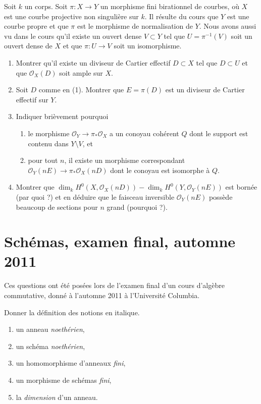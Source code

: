 \begin{exercise}
\label{exercise-birational-morphism-curves-ample}
Soit $k$ un corps. Soit $\pi : X \to Y$ un morphisme fini birationnel
de courbes, où $X$ est une courbe projective non singulière sur $k$.
Il résulte du cours que $Y$ est une courbe propre et
que $\pi$ est le morphisme de normalisation de $Y$.
Nous avons aussi vu dans le cours qu'il existe un ouvert dense $V \subset Y$
tel que $U = \pi^{-1}(V)$ soit un ouvert dense de $X$ et que $\pi : U \to V$
soit un isomorphisme.
\begin{enumerate}
\item Montrer qu'il existe un diviseur de Cartier effectif $D \subset X$
tel que $D \subset U$ et que $\mathcal{O}_X(D)$ soit ample sur $X$.
\item Soit $D$ comme en (1). Montrer que $E = \pi(D)$ est un diviseur de Cartier
effectif sur $Y$.
\item Indiquer brièvement pourquoi
\begin{enumerate}
\item le morphisme $\mathcal{O}_Y \to \pi_*\mathcal{O}_X$ a un conoyau cohérent
$Q$ dont le support est contenu dans $Y \setminus V$, et
\item pour tout $n$, il existe un morphisme correspondant
$\mathcal{O}_Y(nE) \to \pi_*\mathcal{O}_X(nD)$
dont le conoyau est isomorphe à $Q$.
\end{enumerate}
\item Montrer que
$\dim_k H^0(X, \mathcal{O}_X(nD)) - \dim_k H^0(Y, \mathcal{O}_Y(nE))$
est bornée (par quoi ?) et en déduire que le faisceau inversible
$\mathcal{O}_Y(nE)$ possède beaucoup de sections pour $n$ grand (pourquoi ?).
\end{enumerate}
\end{exercise}





\section{Schémas, examen final, automne 2011}
\label{section-final-exam-fall-2011}

\noindent
Ces questions ont été posées lors de l'examen final d'un cours
d'algèbre commutative, donné à l'automne 2011 à l'Université Columbia.


\begin{exercise}[Définitions]
\label{exercise-definitions-fall-2011}
Donner la définition des notions en italique.
\begin{enumerate}
\item un anneau {\it noethérien},
\item un schéma {\it noethérien},
\item un homomorphisme d'anneaux {\it fini},
\item un morphisme de schémas {\it fini},
\item la {\it dimension} d'un anneau.
\end{enumerate}
\end{exercise}

